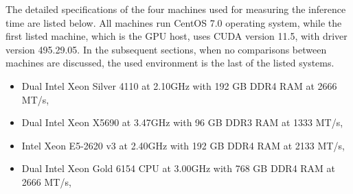 The detailed specifications of the four machines used for measuring the inference time are listed below. All machines run CentOS 7.0 operating system, while the first listed machine, which is the GPU host, uses CUDA version 11.5, with driver version 495.29.05. In the subsequent sections, when no comparisons between machines are discussed, the used environment is the last of the listed systems.

\begin{itemize}
  \item Dual Intel Xeon Silver 4110 at 2.10GHz with 192 GB DDR4 RAM at 2666 MT/s,
  \item Dual Intel Xeon X5690 at 3.47GHz with 96 GB DDR3 RAM at 1333 MT/s,
  \item Intel Xeon E5-2620 v3 at 2.40GHz with 192 GB DDR4 RAM at 2133 MT/s,
  \item Dual Intel Xeon Gold 6154 CPU at 3.00GHz with 768 GB DDR4 RAM at 2666 MT/s,
\end{itemize}

